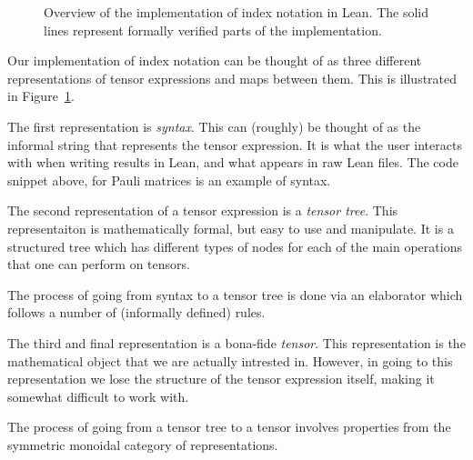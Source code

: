 \documentclass[a4paper, 11pt]{article}
\begin{document}
\begin{figure}
  \centering
  \caption{Overview of the implementation of index notation in Lean. The 
  solid lines represent formally verified parts of the implementation.}
  \label{fig:overviewFlow}
\end{figure}

Our implementation of index notation can be thought of as three different representations of tensor 
expressions and maps between them. This is illustrated in Figure~\ref{fig:overviewFlow}.

The first representation is \emph{syntax}. This can (roughly) be thought of as the informal string
that represents the tensor expression. It is what the user interacts with when 
writing results in Lean, and what appears in raw Lean files. The code snippet above, 
for Pauli matrices is an example of syntax. 

The second representation of a tensor expression is a \emph{tensor tree}. This representaiton is 
mathematically formal, but easy to use and manipulate. 
It is a structured tree which has different types 
of nodes for each of the main operations that one can perform on tensors.

The process of going from syntax to a tensor tree is done via an elaborator 
which follows a number of (informally defined) rules.

The third and final representation is a bona-fide \emph{tensor}. This representation 
is the mathematical object that we are actually intrested in. However, in going to this representation
we lose the structure of the tensor expression itself, making it somewhat difficult to work with. 

The process of going from a tensor tree to a tensor involves properties from the symmetric monoidal 
category of representations. 
\end{document}
